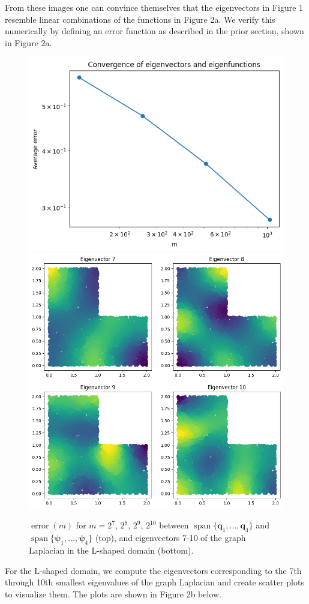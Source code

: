 \documentclass[12pt,a4paper]{article}
\theoremstyle{definition}
\theoremstyle{remark}
\begin{document}
From these images one can convince themselves that the eigenvectors in Figure 1 resemble linear combinations of the functions in Figure 2a. We verify this numerically by defining an error function as described in the prior section, shown in Figure 2a. 

\begin{figure}[h!]
    \centering
    \includegraphics[width=13cm]{fig3.png}
    \includegraphics[width=13cm]{fig4.png}
    \caption{$\operatorname{error}(m)$ for $m=2^7$, $2^8$, $2^9$, $2^{10}$ between $\operatorname{span}\{\mathbf q_1, \dots, \mathbf q_4\}$ and $\operatorname{span}\{\boldsymbol{\psi}_1, \dots, \boldsymbol{\psi}_4\}$ (top), and eigenvectors 7-10 of the graph Laplacian in the L-shaped domain (bottom).}
\end{figure}

For the L-shaped domain, we compute the eigenvectors corresponding to the 7th through 10th smallest eigenvalues of the graph Laplacian and create scatter plots to visualize them. The plots are shown in Figure 2b below.
\end{document}
